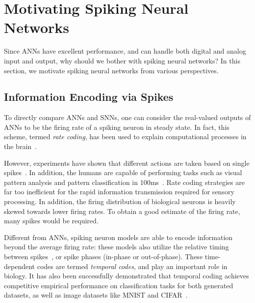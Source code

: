 \documentclass[fyp]{socreport}
\begin{document}
\section{Motivating Spiking Neural Networks\label{sec:motiv-spik-neur}}

Since ANNs have excellent performance, and can handle both digital and analog
input and output, why should we bother with spiking neural networks? In this
section, we motivate spiking neural networks from various perspectives.

\subsection{Information Encoding via Spikes}

To directly compare ANNs and SNNs, one can consider the real-valued outputs of
ANNs to be the firing rate of a spiking neuron in steady state. In fact, this
scheme, termed \emph{rate coding}, has been used to explain computational
processes in the brain~\cite{pfeiffer2018deep}.

However, experiments have shown that different actions are taken based on single
spikes~\cite{stemmler96_singl_spike_suffic}. In addition, the humans are capable
of performing tasks such as visual pattern analysis and pattern classification
in 100ms~\cite{thorpe2001spike}. Rate coding strategies are far too inefficient
for the rapid information transmission required for sensory processing. In
addition, the firing distribution of biological neurons is heavily skewed
towards lower firing rates. To obtain a good estimate of the firing rate, many
spikes would be required.

Different from ANNs, spiking neuron models are able to encode information beyond
the average firing rate: these models also utilize the relative timing between
spikes~\cite{guetig14_to_spike_or_when_to_spike}, or spike phases (in-phase or
out-of-phase). These time-dependent codes are termed \emph{temporal codes}, and
play an important role in biology. It has also been successfully demonstrated
that temporal coding achieves competitive empirical performance on
classification tasks for both generated datasets, as well as image datasets like
MNIST and CIFAR~\cite{comsa19_tempor_codin_spikin_neural_networ}.
\end{document}
